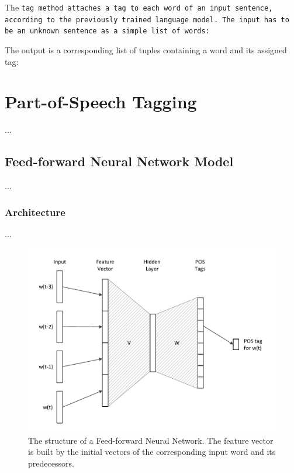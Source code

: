 The \tt{tag} method attaches a tag to each word of an input sentence, according to the previously trained language model. The input has to be an unknown sentence as a simple list of words:



The output is a corresponding list of tuples containing a word and its assigned tag:




\chapter{Part-of-Speech Tagging}\label{c.postagging}
...

\section{Feed-forward Neural Network Model}\label{c.postagging.fnn}
...

\subsection{Architecture}\label{c.postagging.fnn.architecture}
...

\begin{figure}[ht]
	\includegraphics[width=\textwidth]{images/fnn_structure}
	\caption{The structure of a Feed-forward Neural Network. The feature vector is built by the initial vectors of the corresponding input word and its predecessors.}\label{fnn_structure}
\end{figure}

